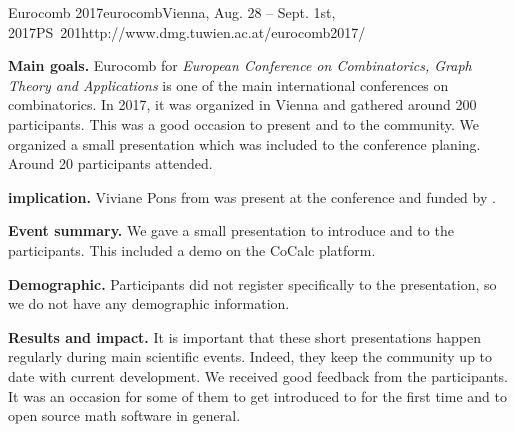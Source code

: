\begin{event}{Eurocomb 2017}{eurocomb}{Vienna, Aug. 28 -- Sept. 1st, 2017}{PS}{~20}{1}{http://www.dmg.tuwien.ac.at/eurocomb2017/}

\textbf{Main goals.} Eurocomb for \textit{European Conference on Combinatorics, Graph Theory and Applications} is one of the main international conferences on combinatorics. In 2017, it was organized in Vienna and gathered around 200 participants. This was a good occasion to present \Sage and \ODK to the community. We organized a small presentation which was included to the conference planing. Around 20 participants attended.

\textbf{\ODK implication.} Viviane Pons from \ODK was present at the conference and funded by \ODK.

\textbf{Event summary.} We gave a small presentation to introduce \Sage and \ODK to the participants. This included a demo on the CoCalc platform.

\textbf{Demographic.} Participants did not register specifically to the \Sage presentation, so we do not have any demographic information.

\textbf{Results and impact.} It is important that these short presentations happen regularly during main scientific events. Indeed, they keep the community up to date with current development. We received good feedback from the participants. It was an occasion for some of them to get introduced to \Sage for the first time and to open source math software in general.

\end{event}
